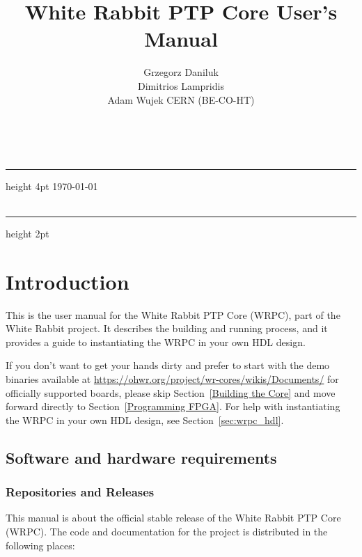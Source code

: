 \documentclass[a4paper, 12pt]{article}
\title{White Rabbit PTP Core User's Manual}
\author{Grzegorz Daniluk \\Dimitrios Lampridis \\Adam Wujek \hfill CERN (BE-CO-HT)}
\renewcommand{\_}{\underscore\allowbreak}
\begin{document}


\makeatletter
{}
\raggedright
{\LARGE\bf\@title}\\[0.2 cm]
\hrule height 4pt \vspace{0.1cm}
{\large\gitrevinfo\hfill\today}\\
\vspace*{\fill}
{\large\@author}\\
\hrule height 2pt
\justify
\makeatother

\newpage

\tableofcontents

\newpage

\section{Introduction}

This is the user manual for the White Rabbit PTP Core (WRPC), part of the White
Rabbit project. It describes the building and running process, and it provides a
guide to instantiating the WRPC in your own HDL design.

If you don't want to get your hands dirty and prefer to start with the demo binaries
available at \url{https://ohwr.org/project/wr-cores/wikis/Documents/} for officially
supported boards, please skip Section~\ref{Building the Core} and move forward
directly to Section~\ref{Programming FPGA}. For help with instantiating the WRPC in
your own HDL design, see Section~\ref{sec:wrpc_hdl}.


\subsection{Software and hardware requirements}
\label{Software and hardware requirements}

\subsubsection{Repositories and Releases}
\label{Repositories and Releases}

This manual is about the official \gitrevinfo{} stable release of the White
Rabbit PTP Core (WRPC).  The code and documentation for the project is
distributed in the following places:
\end{document}
